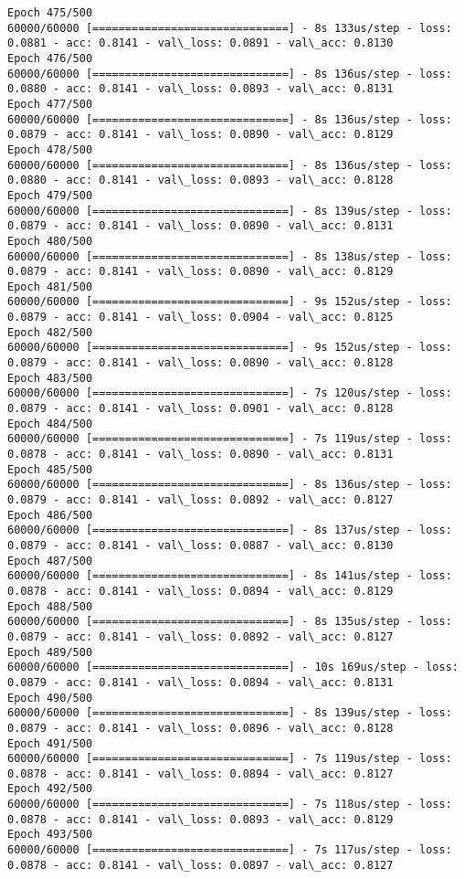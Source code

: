 \documentclass[11pt]{article}
\begin{document}
\begin{Verbatim}[commandchars=\\\{\}]
Epoch 475/500
60000/60000 [==============================] - 8s 133us/step - loss: 0.0881 - acc: 0.8141 - val\_loss: 0.0891 - val\_acc: 0.8130
Epoch 476/500
60000/60000 [==============================] - 8s 136us/step - loss: 0.0880 - acc: 0.8141 - val\_loss: 0.0893 - val\_acc: 0.8131
Epoch 477/500
60000/60000 [==============================] - 8s 136us/step - loss: 0.0879 - acc: 0.8141 - val\_loss: 0.0890 - val\_acc: 0.8129
Epoch 478/500
60000/60000 [==============================] - 8s 136us/step - loss: 0.0880 - acc: 0.8141 - val\_loss: 0.0893 - val\_acc: 0.8128
Epoch 479/500
60000/60000 [==============================] - 8s 139us/step - loss: 0.0879 - acc: 0.8141 - val\_loss: 0.0890 - val\_acc: 0.8131
Epoch 480/500
60000/60000 [==============================] - 8s 138us/step - loss: 0.0879 - acc: 0.8141 - val\_loss: 0.0890 - val\_acc: 0.8129
Epoch 481/500
60000/60000 [==============================] - 9s 152us/step - loss: 0.0879 - acc: 0.8141 - val\_loss: 0.0904 - val\_acc: 0.8125
Epoch 482/500
60000/60000 [==============================] - 9s 152us/step - loss: 0.0879 - acc: 0.8141 - val\_loss: 0.0890 - val\_acc: 0.8128
Epoch 483/500
60000/60000 [==============================] - 7s 120us/step - loss: 0.0879 - acc: 0.8141 - val\_loss: 0.0901 - val\_acc: 0.8128
Epoch 484/500
60000/60000 [==============================] - 7s 119us/step - loss: 0.0878 - acc: 0.8141 - val\_loss: 0.0890 - val\_acc: 0.8131
Epoch 485/500
60000/60000 [==============================] - 8s 136us/step - loss: 0.0879 - acc: 0.8141 - val\_loss: 0.0892 - val\_acc: 0.8127
Epoch 486/500
60000/60000 [==============================] - 8s 137us/step - loss: 0.0879 - acc: 0.8141 - val\_loss: 0.0887 - val\_acc: 0.8130
Epoch 487/500
60000/60000 [==============================] - 8s 141us/step - loss: 0.0878 - acc: 0.8141 - val\_loss: 0.0894 - val\_acc: 0.8129
Epoch 488/500
60000/60000 [==============================] - 8s 135us/step - loss: 0.0879 - acc: 0.8141 - val\_loss: 0.0892 - val\_acc: 0.8127
Epoch 489/500
60000/60000 [==============================] - 10s 169us/step - loss: 0.0879 - acc: 0.8141 - val\_loss: 0.0894 - val\_acc: 0.8131
Epoch 490/500
60000/60000 [==============================] - 8s 139us/step - loss: 0.0879 - acc: 0.8141 - val\_loss: 0.0896 - val\_acc: 0.8128
Epoch 491/500
60000/60000 [==============================] - 7s 119us/step - loss: 0.0878 - acc: 0.8141 - val\_loss: 0.0894 - val\_acc: 0.8127
Epoch 492/500
60000/60000 [==============================] - 7s 118us/step - loss: 0.0878 - acc: 0.8141 - val\_loss: 0.0893 - val\_acc: 0.8129
Epoch 493/500
60000/60000 [==============================] - 7s 117us/step - loss: 0.0878 - acc: 0.8141 - val\_loss: 0.0897 - val\_acc: 0.8127

\end{Verbatim}
\end{document}
